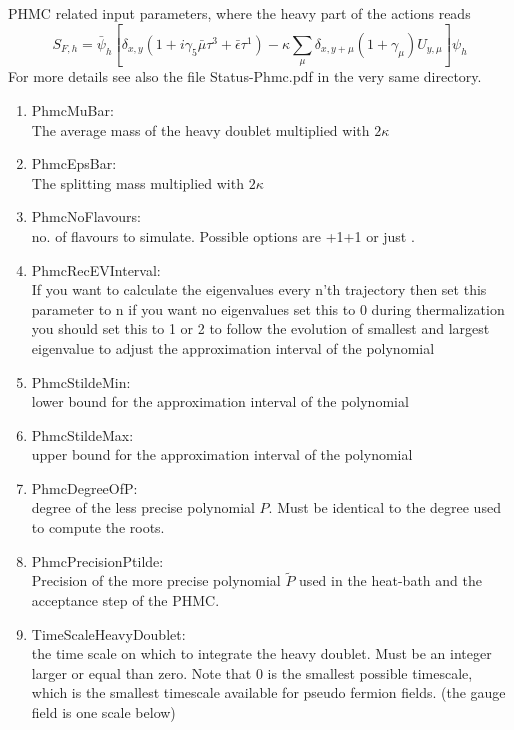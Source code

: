 \noindent PHMC related input parameters, where the heavy part of the actions
reads
\begin{equation}
  \label{eq:haction}
  S_{F,h} = \bar\psi_h\left[ \delta_{x,y}(1+i\gamma_5\bar\mu\tau^3 +
    \bar\epsilon\tau^1)
  - \kappa\sum_\mu \delta_{x,y+\mu}(1+\gamma_\mu)U_{y,\mu}\right] \psi_h
\end{equation}
For more details see also the file {\ttfamily Status-Phmc.pdf} in the
very same directory.
\begin{enumerate}
\item {\ttfamily PhmcMuBar}:\\
  The average mass of the heavy doublet multiplied with $2\kappa$

\item {\ttfamily PhmcEpsBar}:\\
  The splitting mass multiplied with $2\kappa$

\item {\ttfamily PhmcNoFlavours}:\\
  no. of flavours to simulate. Possible options are {+1+1}
  or just {}.

\item {\ttfamily PhmcRecEVInterval}:\\
  If you want to calculate the eigenvalues every n'th trajectory
  then set this parameter to n if you want no eigenvalues set this to 0
  during thermalization you should set this to 1 or 2 to follow the evolution
  of smallest and largest eigenvalue to adjust the approximation interval
  of the polynomial

\item {\ttfamily PhmcStildeMin}:\\
  lower bound for the approximation interval of the polynomial

\item {\ttfamily PhmcStildeMax}:\\
  upper bound for the approximation interval of the polynomial

\item {\ttfamily PhmcDegreeOfP}:\\
  degree of the less precise polynomial $P$. Must be identical to the
  degree used to compute the roots.

\item {\ttfamily PhmcPrecisionPtilde}:\\
  Precision of the more precise polynomial $\tilde P$ used in the
  heat-bath and the acceptance step of the PHMC.

\item {\ttfamily TimeScaleHeavyDoublet}:\\
  the time scale on which to integrate the heavy doublet. Must be an
  integer larger or equal than zero. Note that 0 is the smallest possible
  timescale, which is the smallest timescale available for pseudo
  fermion fields. (the gauge field is one scale below)

\end{enumerate}

